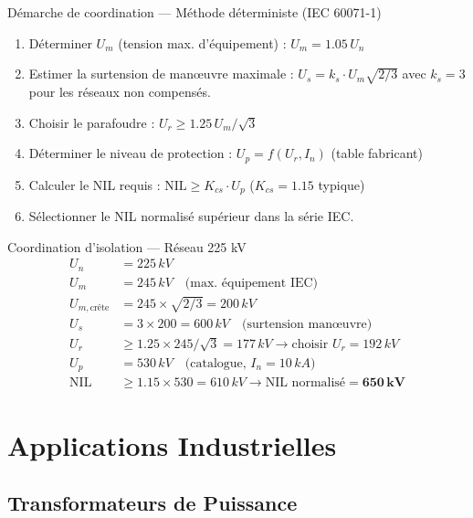 \documentclass[12pt, a4paper, twoside]{report}
\begin{document}
\begin{formulebox}{Démarche de coordination — Méthode déterministe (IEC 60071-1)}
\begin{enumerate}
  \item Déterminer $U_m$ (tension max. d'équipement) : $U_m = 1.05\,U_n$
  \item Estimer la surtension de manœuvre maximale : $U_s = k_s \cdot U_m\sqrt{2/3}$
    avec $k_s = 3$ pour les réseaux non compensés.
  \item Choisir le parafoudre : $U_r \geq 1.25\,U_m/\sqrt{3}$
  \item Déterminer le niveau de protection : $U_p = f(U_r, I_n)$ (table fabricant)
  \item Calculer le NIL requis : $\text{NIL} \geq K_{cs} \cdot U_p$ ($K_{cs} = 1.15$ typique)
  \item Sélectionner le NIL normalisé supérieur dans la série IEC.
\end{enumerate}
\end{formulebox}

\begin{exemple}{Coordination d'isolation — Réseau 225 kV}
\begin{align*}
  U_n &= 225\,\si{kV} \\
  U_m &= 245\,\si{kV} \quad \text{(max. équipement IEC)} \\
  U_{m,\text{crête}} &= 245 \times \sqrt{2/3} = 200\,\si{kV} \\
  U_s &= 3 \times 200 = 600\,\si{kV} \quad \text{(surtension manœuvre)} \\
  U_r &\geq 1.25 \times 245/\sqrt{3} = 177\,\si{kV} \rightarrow \text{choisir } U_r = 192\,\si{kV} \\
  U_p &= 530\,\si{kV} \quad \text{(catalogue, } I_n = 10\,\si{kA)} \\
  \text{NIL} &\geq 1.15 \times 530 = 610\,\si{kV} \rightarrow \text{NIL normalisé} = \mathbf{650\,\si{kV}}
\end{align*}
\end{exemple}

\chapter{Applications Industrielles}

\section{Transformateurs de Puissance}
\end{document}
